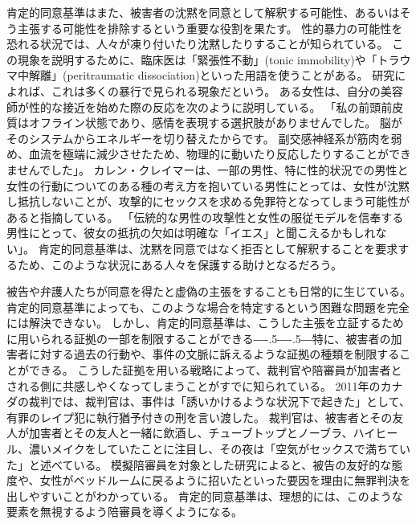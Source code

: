 \documentclass[paper=a4,book,openany]{jlreq}
\newcommand{\ig}[1]{}           %
\def\DDASH{―\kern-.5\zw―\kern-.5\zw―} %
\begin{document}
肯定的同意基準はまた、被害者の沈黙を同意として解釈する可能性、あるいはそう主張する可能性を排除するという重要な役割を果たす。
性的暴力の可能性を恐れる状況では、人々が凍り付いたり沈黙したりすることが知られている。
この現象を説明するために、臨床医は「緊張性不動」(tonic immobility)や「トラウマ中解離」(peritraumatic dissociation)といった用語を使うことがある。
研究によれば、これは多くの暴行で見られる現象だという\citep{moller17:_tonic_immob_durin_sexual_assaul}。
ある女性は、自分の美容師が性的な接近を始めた際の反応を次のように説明している。
「私の前頭前皮質はオフライン状態であり、感情を表現する選択肢がありませんでした。
脳がそのシステムからエネルギーを切り替えたからです。
副交感神経系が筋肉を弱め、血流を極端に減少させたため、物理的に動いたり反応したりすることができませんでした」\citep{corvo18:_why_i_froze_smiled_durin}。
カレン・クレイマー\ig{Karen Kramer}は、一部の男性、特に性的状況での男性と女性の行動についてのある種の考え方を抱いている男性にとっては、女性が沈黙し抵抗しないことが、攻撃的にセックスを求める免罪符となってしまう可能性があると指摘している。
「伝統的な男性の攻撃性と女性の服従モデルを信奉する男性にとって、彼女の抵抗の欠如は明確な「イエス」と聞こえるかもしれない」\citep[p.121]{kramer94:_rule_myth}。
肯定的同意基準は、沈黙を同意ではなく拒否として解釈することを要求するため、このような状況にある人々を保護する助けとなるだろう。

被告や弁護人たちが同意を得たと虚偽の主張をすることも日常的に生じている。
肯定的同意基準によっても、このような場合を特定するという困難な問題を完全には解決できない。
しかし、肯定的同意基準は、こうした主張を立証するために用いられる証拠の一部を制限することができる{\DDASH}特に、被害者の加害者に対する過去の行動や、事件の文脈に訴えるような証拠の種類を制限することができる。
こうした証拠を用いる戦略によって、裁判官や陪審員が加害者とされる側に共感しやくなってしまうことがすでに知られている。
2011年のカナダの裁判では、裁判官は、事件は「誘いかけるような状況下で起きた」として、有罪のレイプ犯に執行猶予付きの刑を言い渡した。
裁判官は、被害者とその友人が加害者とその友人と一緒に飲酒し、チューブトップとノーブラ、ハイヒール、濃いメイクをしていたことに注目し、その夜は「空気がセックスで満ちていた」と述べている\citep{cbc11:_manit_judge_rebuk_sex_assaul_remar}。
模擬陪審員を対象とした研究によると、被告の友好的な態度や、女性がベッドルームに戻るように招いたといった要因を理由に無罪判決を出しやすいことがわかっている\citep{finch06:_break_bound}。
肯定的同意基準は、理想的には、このような要素を無視するよう陪審員を導くようになる。
\end{document}
